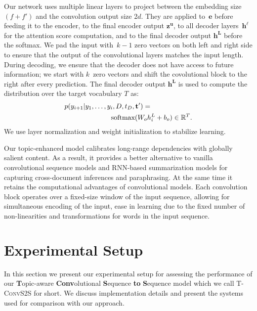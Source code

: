 \documentclass[11pt,a4paper]{article}
\begin{document}
Our network uses multiple linear layers to project between the
embedding size $(f+f')$ and the convolution output size $2d$. They are
applied to~$\mathbf{e}$ before feeding it to the encoder, to the final
encoder output $\mathbf{z^u}$, to all decoder layers~$\mathbf{h^{\ell}}$
for the attention score computation, and to the final decoder output
$\mathbf{h^L}$ before the softmax.  We pad the input with~$k-1$ zero
vectors on both left and right side to ensure that the output of the
convolutional layers matches the input length. During decoding, we
ensure that the decoder does not have access to future information; we
start with $k$~zero vectors and shift the covolutional block to the
right after every prediction. The final decoder output $\mathbf{h^L}$
is used to compute the distribution over the target vocabulary $T$ as:
\begin{align}
  p(y_{i+1}|y_1,\ldots,y_i,D,t_D,\mathbf{t'}) = & \\
& \hspace*{-2cm}\mbox{softmax}(W_oh^L_i+b_o) \in \mathbb{R}^T. \label{eq:prediction}
\end{align}
We use layer normalization and weight initialization to
stabilize learning. 


Our topic-enhanced model calibrates long-range dependencies with
globally salient content. As a result, it provides a better
alternative to vanilla convolutional sequence models
\cite{convseq2seq} and RNN-based summarization models \cite{see-acl17}
for capturing cross-document inferences and paraphrasing.  At the same
time it retains the computational advantages of convolutional
models. Each convolution block operates over a fixed-size window of
the input sequence, allowing for simultaneous encoding of the input,
ease in learning due to the fixed number of non-linearities and
transformations for words in the input sequence.








 
\section{Experimental Setup}
\label{sec:setup}

In this section we present our experimental setup for assessing the
performance of our \textbf{T}opic-aware \textbf{Conv}olutional
\textbf{S}equence \textbf{to} \textbf{S}equence model which we call
\textsc{T-ConvS2S} for short.  We discuss implementation details and
present the systems used for comparison with our approach.
\end{document}
